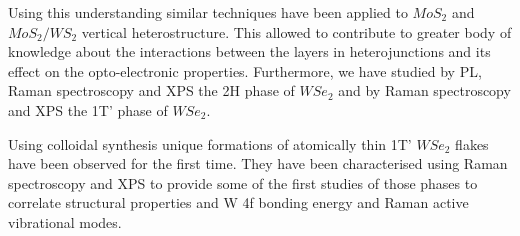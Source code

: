 Using this understanding similar techniques have been applied to $MoS_2$ and $MoS_2/WS_2$ vertical heterostructure. This allowed to contribute to greater body of knowledge about the interactions between the layers in heterojunctions and its effect on the opto-electronic properties. Furthermore, we have studied by PL, Raman spectroscopy and XPS the 2H phase of $WSe_2$ and by Raman spectroscopy and XPS the 1T’ phase of $WSe_2$.

Using colloidal synthesis unique formations of atomically thin 1T' $WSe_2$ flakes have been observed for the first time. They have been characterised using Raman spectroscopy and XPS to provide some of the first studies of those phases to correlate structural properties and W 4f bonding energy and Raman active vibrational modes.